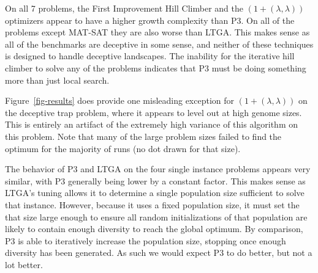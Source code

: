 \documentclass{sig-alternate}
\begin{document}
On all 7 problems, the First Improvement Hill Climber and the $(1+(\lambda,\lambda))$
optimizers appear to have a higher growth complexity than P3.  On all of the problems
except MAT-SAT they are also worse than LTGA.  This makes sense as all of the
benchmarks are deceptive in some sense, and neither of these techniques is designed
to handle deceptive landscapes.  The inability for the iterative hill climber to solve
any of the problems indicates that P3 must be doing something more than just local search.

Figure~\ref{fig-results} does provide one misleading
exception for $(1+(\lambda,\lambda))$ on the deceptive trap problem, where it appears to
level out at high genome sizes.  This is entirely an artifact of the extremely high
variance of this algorithm on this problem.  Note that many of the large problem
sizes failed to find the optimum for the majority of runs (no dot drawn for that size).

The behavior of P3 and LTGA on the four single instance problems appears very similar,
with P3 generally being lower by a constant factor.  This makes sense as LTGA's
tuning allows it to determine a single population size sufficient to solve that
instance.  However, because it uses a fixed population size, it must set the that
size large enough to ensure all random initializations of that population are
likely to contain enough diversity to reach the global optimum.  By comparison, P3 is able to
iteratively increase the population size, stopping once enough diversity has been generated.
As such we would expect P3 to do better, but not a lot better.
\end{document}

